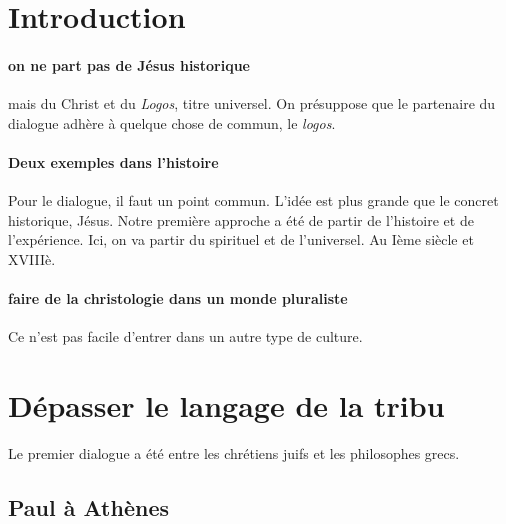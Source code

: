 \section{Introduction}


\paragraph{on ne part pas de Jésus historique} mais du Christ et du \textit{Logos}, titre universel. 
On présuppose que le partenaire du dialogue adhère à quelque chose de commun, le \textit{logos}.

\paragraph{Deux exemples dans l'histoire} Pour le dialogue, il faut un point commun. L'idée est plus grande que le concret historique, Jésus. Notre première approche a été de partir de l'histoire et de l'expérience. Ici, on va partir du spirituel et de l'universel. Au Ième siècle et XVIIIè.

\paragraph{faire de la christologie dans un monde pluraliste} Ce n'est pas facile d'entrer dans un autre type de culture.

\section{Dépasser le langage de la tribu}

Le premier dialogue a été entre les chrétiens juifs et les philosophes grecs. 

 \subsection{Paul à Athènes}

